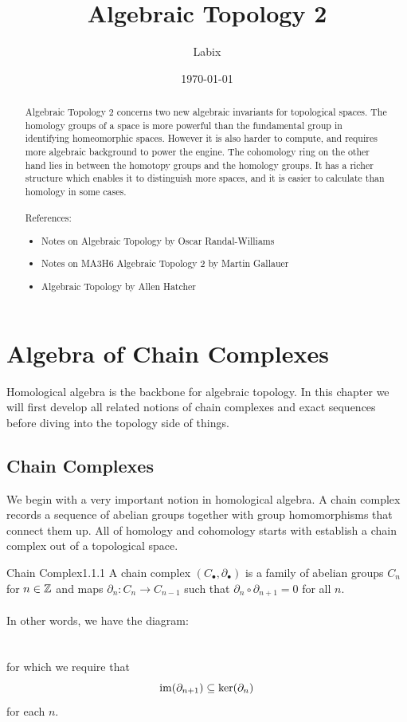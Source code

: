 \documentclass[a4paper]{article}
\title{Algebraic Topology 2}
\author{Labix}
\date{\today}
\begin{document}
\maketitle
\begin{abstract}
Algebraic Topology 2 concerns two new algebraic invariants for topological spaces. The homology groups of a space is more powerful than the fundamental group in identifying homeomorphic spaces. However it is also harder to compute, and requires more algebraic background to power the engine. The cohomology ring on the other hand lies in between the homotopy groups and the homology groups. It has a richer structure which enables it to distinguish more spaces, and it is easier to calculate than homology in some cases. \\~\\

References: 
\begin{itemize}
\item Notes on Algebraic Topology by Oscar Randal-Williams
\item Notes on MA3H6 Algebraic Topology 2 by Martin Gallauer
\item Algebraic Topology by Allen Hatcher
\end{itemize}
\end{abstract}
\pagebreak
\tableofcontents

\pagebreak
\section{Algebra of Chain Complexes}
Homological algebra is the backbone for algebraic topology. In this chapter we will first develop all related notions of chain complexes and exact sequences before diving into the topology side of things. 

\subsection{Chain Complexes}
We begin with a very important notion in homological algebra. A chain complex records a sequence of abelian groups together with group homomorphisms that connect them up. All of homology and cohomology starts with establish a chain complex out of a topological space. 

\begin{defn}{Chain Complex}{1.1.1} A chain complex $(C_\bullet,\partial_\bullet)$ is a family of abelian groups $C_n$ for $n\in\mathbb{Z}$ and maps $\partial_n:C_n\to C_{n-1}$ such that $\partial_n\circ\partial_{n+1}=0$ for all $n$. \\~\\
In other words, we have the diagram: \\
\\~\\
for which we require that $$\operatorname{im}(\partial_{n+1})\subseteq\ker(\partial_n)$$ for each $n$. 
\end{defn}
\end{document}
